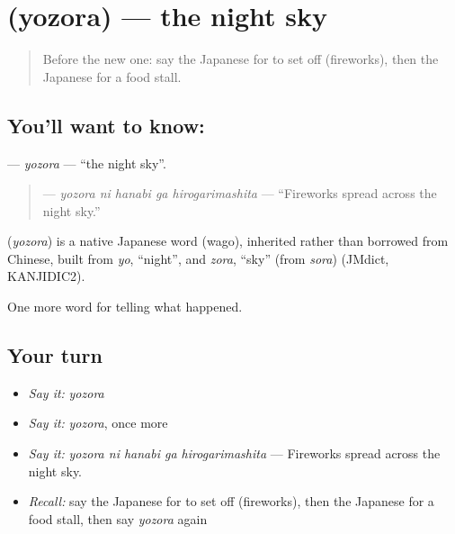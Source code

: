 \section[\texorpdfstring{\ja{よぞら} (yozora)}{よぞら (yozora)}]{ (yozora) — the night sky}

\label{lesson:JA-C293-yozora}



\begin{quote}
Before the new one: say the Japanese for to set off (fireworks), then the Japanese for a food stall.
\end{quote}

\subsection*{You'll want to know: }
\textbf{} — \emph{yozora} — \textquotedblleft{}the night sky\textquotedblright{}.

\begin{quote}
\textbf{  } — \emph{yozora ni hanabi ga hirogarimashita} — \textquotedblleft{}Fireworks spread across the night sky.\textquotedblright{}
\end{quote}

\begin{cousinweb}
\textbf{} (\emph{yozora}) is a native Japanese word (wago), inherited rather than borrowed from Chinese, built from \emph{yo}, \textquotedblleft{}night\textquotedblright{}, and \emph{zora}, \textquotedblleft{}sky\textquotedblright{} (from \emph{sora}) (JMdict, KANJIDIC2).
\end{cousinweb}

\begin{grammarlens}[title={What you've built}]
One more word for telling what happened.
\end{grammarlens}

\subsection*{Your turn}
\begin{itemize}
\raggedright
  \item \emph{Say it:} \emph{yozora}
  \item \emph{Say it:} \emph{yozora}, once more
  \item \emph{Say it:} \emph{yozora ni hanabi ga hirogarimashita} — Fireworks spread across the night sky.
  \item \emph{Recall:} say the Japanese for to set off (fireworks), then the Japanese for a food stall, then say \emph{yozora} again
\end{itemize}

